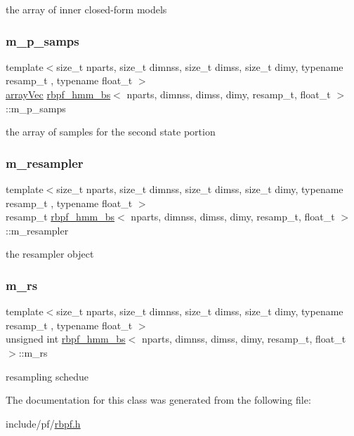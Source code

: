 the array of inner closed-\/form models \mbox{\label{classrbpf__hmm__bs_aa7b6a726eed547f0c30d12b499d5a251}} 
\subsubsection{\texorpdfstring{m\+\_\+p\+\_\+samps}{m\_p\_samps}}
{\footnotesize\ttfamily template$<$size\+\_\+t nparts, size\+\_\+t dimnss, size\+\_\+t dimss, size\+\_\+t dimy, typename resamp\+\_\+t , typename float\+\_\+t $>$ \\
\hyperlink{classrbpf__hmm__bs_a073f5b7f5015d394259510b20f693a19}{array\+Vec} \hyperlink{classrbpf__hmm__bs}{rbpf\+\_\+hmm\+\_\+bs}$<$ nparts, dimnss, dimss, dimy, resamp\+\_\+t, float\+\_\+t $>$\+::m\+\_\+p\+\_\+samps\hspace{0.3cm}{\ttfamily [private]}}

the array of samples for the second state portion \mbox{\label{classrbpf__hmm__bs_ad7b27f32a6ff8e79ff0ffd7cf6f14434}} 
\subsubsection{\texorpdfstring{m\+\_\+resampler}{m\_resampler}}
{\footnotesize\ttfamily template$<$size\+\_\+t nparts, size\+\_\+t dimnss, size\+\_\+t dimss, size\+\_\+t dimy, typename resamp\+\_\+t , typename float\+\_\+t $>$ \\
resamp\+\_\+t \hyperlink{classrbpf__hmm__bs}{rbpf\+\_\+hmm\+\_\+bs}$<$ nparts, dimnss, dimss, dimy, resamp\+\_\+t, float\+\_\+t $>$\+::m\+\_\+resampler\hspace{0.3cm}{\ttfamily [private]}}

the resampler object \mbox{\label{classrbpf__hmm__bs_a3c6154b8e0914dd042d6b08cfcb7d729}} 
\subsubsection{\texorpdfstring{m\+\_\+rs}{m\_rs}}
{\footnotesize\ttfamily template$<$size\+\_\+t nparts, size\+\_\+t dimnss, size\+\_\+t dimss, size\+\_\+t dimy, typename resamp\+\_\+t , typename float\+\_\+t $>$ \\
unsigned int \hyperlink{classrbpf__hmm__bs}{rbpf\+\_\+hmm\+\_\+bs}$<$ nparts, dimnss, dimss, dimy, resamp\+\_\+t, float\+\_\+t $>$\+::m\+\_\+rs\hspace{0.3cm}{\ttfamily [private]}}

resampling schedue 

The documentation for this class was generated from the following file\+:\begin{DoxyCompactItemize}
\item 
include/pf/\hyperlink{rbpf_8h}{rbpf.\+h}\end{DoxyCompactItemize}
